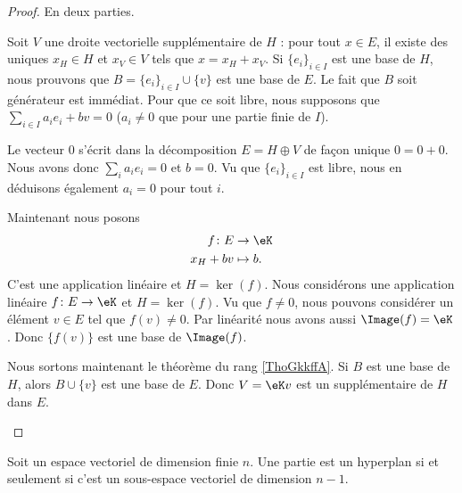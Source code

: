 \begin{proof}
	En deux parties.
	\begin{subproof}
		\spitem[\ref{ITEMooUCWQooToKrop} \( \Rightarrow\) \ref{ITEMooXVIPooNxijzA}]
		Soit \( V\) une droite vectorielle supplémentaire de \( H\) : pour tout \( x\in E\), il existe des uniques \( x_H\in H\) et \( x_V\in V\) tels que \( x=x_H+x_V\). Si \( \{ e_i \}_{i\in I}\) est une base de \( H\), nous prouvons que \( B=\{ e_i \}_{i\in I}\cup \{ v \}\) est une base de \( E\). Le fait que \( B\) soit générateur est immédiat. Pour que ce soit libre, nous supposons que \( \sum_{i\in I}a_ie_i+bv=0\) (\( a_i\neq 0\) que pour une partie finie de \( I\)).

		Le vecteur \( 0\) s'écrit dans la décomposition \( E=H\oplus V\) de façon unique \( 0=0+0\). Nous avons donc \( \sum_ia_ie_i=0\) et \( b=0\). Vu que \( \{ e_i \}_{i\in I}\) est libre, nous en déduisons également \( a_i=0\) pour tout \( i\).

		Maintenant nous posons
		\begin{equation}
			\begin{aligned}
				f\colon E & \to \eK    \\
				x_H+bv    & \mapsto b.
			\end{aligned}
		\end{equation}
		C'est une application linéaire et \( H=\ker(f)\).
		\spitem[\ref{ITEMooXVIPooNxijzA} \( \Rightarrow\) \ref{ITEMooUCWQooToKrop}]
		Nous considérons une application linéaire \(f \colon E\to \eK  \) et \( H=\ker(f)\). Vu que \( f\neq 0\), nous pouvons considérer un élément \( v\in E\) tel que \( f(v)\neq 0\). Par linéarité nous avons aussi \( \Image(f)=\eK\). Donc \( \{ f(v) \}\) est une base de \( \Image(f)\).

		Nous sortons maintenant le théorème du rang \ref{ThoGkkffA}. Si \( B\) est une base de \( H\), alors \( B\cup\{ v \}\) est une base de \( E\). Donc \( V=\eK v\) est un supplémentaire de \( H\) dans \( E\).
	\end{subproof}
\end{proof}

\begin{proposition}	\label{PROPooUZZDooPAKmvN}
	Soit un espace vectoriel de dimension finie \( n\). Une partie est un hyperplan si et seulement si c'est un sous-espace vectoriel de dimension \( n-1\).
\end{proposition}


